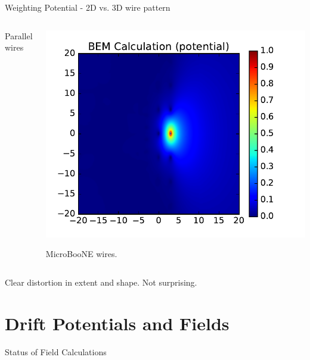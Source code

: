 \documentclass[xcolor=dvipsnames]{beamer}
\newcommand{\microboone}{MicroBooNE\xspace}
\begin{document}
\begin{frame}{Weighting Potential - 2D vs. 3D wire pattern}
\begin{columns}
\begin{column}{0.5\textwidth}
\begin{center}
        \scriptsize Parallel wires
      \end{center}
    \end{column}
    \begin{column}{0.5\textwidth}
      \begin{center}
        \includegraphics[height=0.65\textheight]{uboone-near-d11.pdf}

        \scriptsize \microboone wires.
      \end{center}
    \end{column}
  \end{columns}

  \begin{center}
    Clear distortion in extent and shape.  Not surprising.
  \end{center}

\end{frame}

\section{Drift Potentials and Fields}

\begin{frame}{Status of Field Calculations}
  \tableofcontents[currentsection]
\end{frame}
\end{document}
